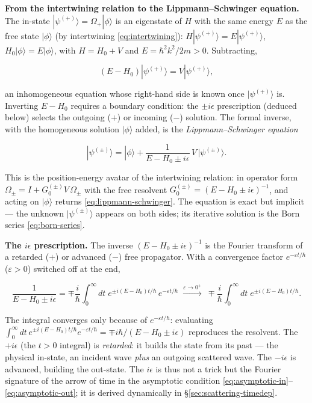 \medskip\noindent\textbf{From the intertwining relation to the Lippmann--Schwinger equation.}
The in-state $|\psi^{(+)}\rangle=\Omega_{+}|\phi\rangle$ is an eigenstate of $H$ with the same energy $E$ as the free state $|\phi\rangle$ (by intertwining \eqref{eq:intertwining}): $H|\psi^{(+)}\rangle=E|\psi^{(+)}\rangle$, $H_{0}|\phi\rangle=E|\phi\rangle$, with $H=H_{0}+V$ and $E=\hbar^{2}k^{2}/2m>0$. Subtracting,
\begin{linenomath}
\begin{equation*}
(E-H_{0})|\psi^{(+)}\rangle = V|\psi^{(+)}\rangle,
\end{equation*}
\end{linenomath}
an inhomogeneous equation whose right-hand side is known once $|\psi^{(+)}\rangle$ is. Inverting $E-H_{0}$ requires a boundary condition: the $\pm i\epsilon$ prescription (deduced below) selects the outgoing ($+$) or incoming ($-$) solution. The formal inverse, with the homogeneous solution $|\phi\rangle$ added, is the \emph{Lippmann--Schwinger equation}
\begin{linenomath}
\begin{equation}
|\psi^{(\pm)}\rangle = |\phi\rangle + \frac{1}{E-H_{0}\pm i\epsilon}\,V\,|\psi^{(\pm)}\rangle.
\label{eq:lippmann-schwinger}
\end{equation}
\end{linenomath}
This is the position-energy avatar of the intertwining relation: in operator form $\Omega_{\pm}=I+G_{0}^{(\pm)}V\,\Omega_{\pm}$ with the free resolvent $G_{0}^{(\pm)}=(E-H_{0}\pm i\epsilon)^{-1}$, and acting on $|\phi\rangle$ returns \eqref{eq:lippmann-schwinger}. The equation is exact but implicit --- the unknown $|\psi^{(\pm)}\rangle$ appears on both sides; its iterative solution is the Born series \eqref{eq:born-series}.

\medskip\noindent\textbf{The $i\epsilon$ prescription.}
The inverse $(E-H_{0}\pm i\epsilon)^{-1}$ is the Fourier transform of a retarded ($+$) or advanced ($-$) free propagator. With a convergence factor $e^{-\varepsilon t/\hbar}$ ($\varepsilon>0$) switched off at the end,
\begin{linenomath}
\begin{equation}
\frac{1}{E-H_{0}\pm i\epsilon}
= \mp\frac{i}{\hbar}\int_{0}^{\infty}\!dt\; e^{\pm i(E-H_{0})t/\hbar}\,e^{-\varepsilon t/\hbar}
\;\xrightarrow{\varepsilon\to0^{+}}\;
\mp\frac{i}{\hbar}\int_{0}^{\infty}\!dt\; e^{\pm i(E-H_{0})t/\hbar}.
\label{eq:iepsilon-time}
\end{equation}
\end{linenomath}
The integral converges only because of $e^{-\varepsilon t/\hbar}$: evaluating $\int_{0}^{\infty}dt\,e^{\pm i(E-H_{0})t/\hbar}e^{-\varepsilon t/\hbar}=\mp i\hbar/(E-H_{0}\pm i\epsilon)$ reproduces the resolvent. The $+i\epsilon$ (the $t>0$ integral) is \emph{retarded}: it builds the state from its past --- the physical in-state, an incident wave \emph{plus} an outgoing scattered wave. The $-i\epsilon$ is advanced, building the out-state. The $i\epsilon$ is thus not a trick but the Fourier signature of the arrow of time in the asymptotic condition \eqref{eq:asymptotic-in}--\eqref{eq:asymptotic-out}; it is derived dynamically in \S\ref{sec:scattering-timedep}.

